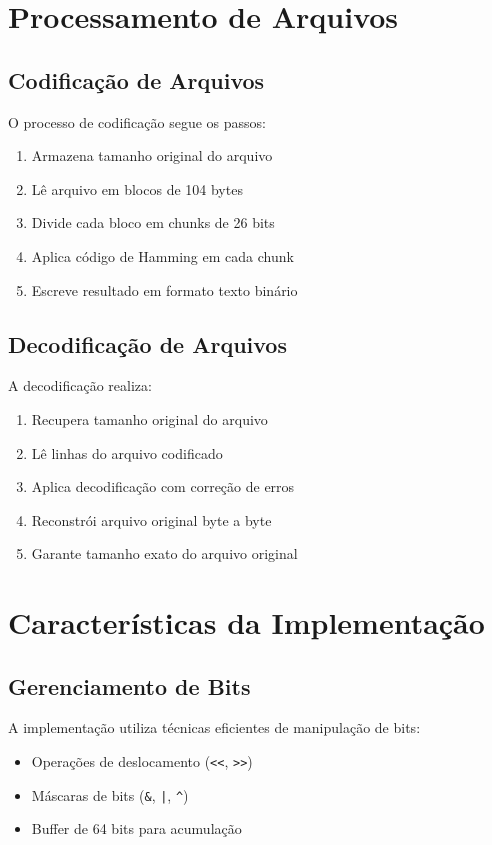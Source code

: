 \documentclass[12pt,a4paper]{article}
\begin{document}
\section{Processamento de Arquivos}

\subsection{Codificação de Arquivos}
O processo de codificação segue os passos:

\begin{enumerate}
    \item Armazena tamanho original do arquivo
    \item Lê arquivo em blocos de 104 bytes
    \item Divide cada bloco em chunks de 26 bits
    \item Aplica código de Hamming em cada chunk
    \item Escreve resultado em formato texto binário
\end{enumerate}

\subsection{Decodificação de Arquivos}
A decodificação realiza:

\begin{enumerate}
    \item Recupera tamanho original do arquivo
    \item Lê linhas do arquivo codificado
    \item Aplica decodificação com correção de erros
    \item Reconstrói arquivo original byte a byte
    \item Garante tamanho exato do arquivo original
\end{enumerate}

\section{Características da Implementação}

\subsection{Gerenciamento de Bits}
A implementação utiliza técnicas eficientes de manipulação de bits:

\begin{itemize}
    \item Operações de deslocamento (\texttt{<<}, \texttt{>>})
    \item Máscaras de bits (\texttt{\&}, \texttt{|}, \texttt{\^{}})
    \item Buffer de 64 bits para acumulação
\end{itemize}
\end{document}
